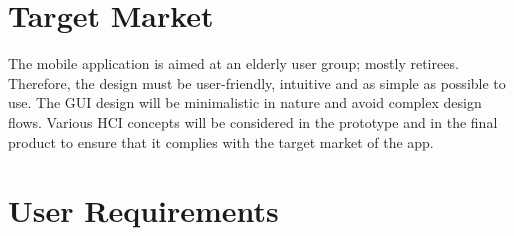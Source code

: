 \documentclass[12pt,a4paper,oneside]{report}
\begin{document}
\section{Target Market}
  \begin{spacing}{1.4}
    The mobile application is aimed at an elderly user group; mostly retirees.  Therefore, the design must be user-friendly, intuitive and as simple as possible to use.  The GUI design will be minimalistic in nature and avoid complex design flows. Various HCI concepts will be considered in the prototype and in the final product to ensure that it complies with the target market of the app.
  \end{spacing}

\section{User Requirements}
\end{document}
